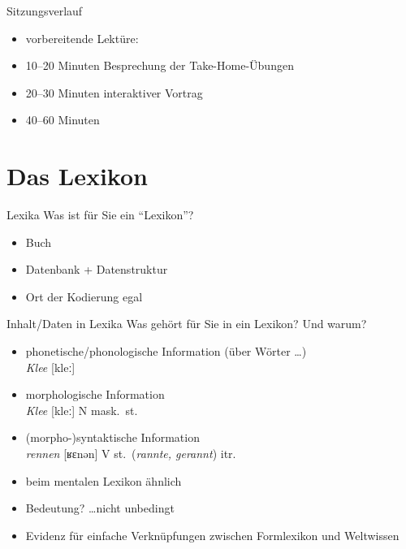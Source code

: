 \begin{frame}
  {Sitzungsverlauf}
  \onslide<+->
  \begin{itemize}[<+->]
    \item vorbereitende Lektüre: \citet{Schaefer2018b}
    \item 10--20 Minuten Besprechung der Take-Home-Übungen
    \item 20--30 Minuten interaktiver Vortrag
    \item 40--60 Minuten 
  \end{itemize}
\end{frame}

\section{Das Lexikon}

\begin{frame}
  {Lexika}
  \onslide<+->
  Was ist für Sie ein "`Lexikon"'?\\
  \Zeile
  \onslide<+->
  \onslide<+->
  \begin{itemize}[<+->]
    \item Buch
    \item \alert{Datenbank} + Datenstruktur
    \item Ort der Kodierung \alert{egal}
  \end{itemize}
\end{frame}

\begin{frame}
  {Inhalt\slash Daten in Lexika}
  \onslide<+->
  Was gehört für Sie in ein Lexikon? Und warum?\\
  \Zeile
  \onslide<+->
  \onslide<+->
  \begin{itemize}[<+->]
    \item phonetische\slash phonologische Information (über Wörter \ldots)\\
      \Viertelzeile
      \textit{Klee} \alert{[kleː]}
    \item morphologische Information\\
      \Viertelzeile
      \textit{Klee} [kleː] \alert{N mask.\ st.}
    \item (morpho-)syntaktische Information\\
      \Viertelzeile
      \textit{rennen} [ʁɛnən] V st.\ (\textit{rannte, gerannt}) \alert{itr.}
      \Halbzeile
    \item beim mentalen Lexikon ähnlich
      \Halbzeile
    \item \alert{Bedeutung?} \ldots nicht unbedingt \citep{Elman2009}
    \item Evidenz für einfache Verknüpfungen zwischen \alert{Formlexikon} und \alert{Weltwissen}
  \end{itemize}
\end{frame}


